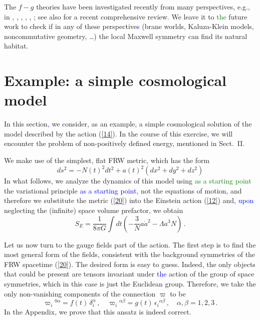 \documentclass[prd,reprint,eqsecnum,nofootinbib]{revtex4-1}
\begin{document}
The $f-g$ theories have been investigated recently from many
perspectives, e.g., in \cite{Banados:2008fi}, \cite{Damour:2002wu},
\cite{Damour:2002ws}, \cite{ArkaniHamed:2002sp}, \cite{Blas:2005yk},
\cite{Speziale:2010cf}; see also \cite{Clifton:2011jh} for a recent
comprehensive review. We leave it to \textcolor{green}{the} future work to check if in
any of these perspective\textcolor{blue}{s} (brane worlds, Kaluza-Klein models,
noncommutative geometry, \ldots) the local Maxwell symmetry can find
its natural habitat.

\section{Example: a simple cosmological model}

In this section\textcolor{blue}{,} we consider, as an example, a simple cosmological
solution of the model described by the action (\ref{14}). In the
course of this exercise\textcolor{blue}{,} we will encounter the problem of
non-positively defined energy, mentioned in Sect.\ II.

We make use of the simplest, flat FRW metric, which has the form
\begin{equation}\label{20}
    ds^2 =-N(t)^2dt^2+a(t)^2 (dx^2+dy^2+dz^2)
\end{equation}
In what follows\textcolor{blue}{,} we analyze the dynamics of this model using \textcolor{green}{as a starting point} the variational principle \textcolor{blue}{as a starting point}, not the equations of
motion, and therefore we substitute the metric (\ref{20}) into the
Einstein action (\ref{12}) and\textcolor{blue}{, upon} neglecting the (infinite) space
volume prefactor\textcolor{blue}{,} we obtain
\begin{equation}
S_E=\frac{1}{8\pi G}\int dt \left(-\frac{3}{N}a\dot a^2-\Lambda a^3
N\right)\,.\label{21}
\end{equation}

Let us now turn to the gauge fields part of the action. The first
step is to find the most general form of the fields, consistent with
the background symmetries of the FRW spacetime (\ref{20}). The
desired form is easy to guess. Indeed\textcolor{blue}{,} the only objects that could be
present are tensors invariant under \textcolor{blue}{the} action of the group of space
symmetries, which in this case is just the Euclidean group.
Therefore\textcolor{blue}{,} we take the only non-vanishing components of the
connection $\varpi$ to be
\begin{equation}\label{22}
    \varpi_i{}^{0\alpha} = f(t)\, \delta_i^\alpha\,,
    \quad \varpi_i{}^{\alpha\beta} = g(t)\,
    \epsilon_i{}^{\alpha\beta}\,,\quad \alpha,\beta=1,2,3\,.
\end{equation}
In the Appendix\textcolor{blue}{,} we prove that this ansatz is indeed correct.
\end{document}

